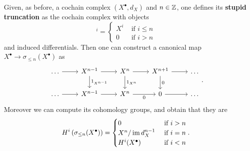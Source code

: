 \begin{defn}
	Given, as before, a cochain complex $\left( X^{\bullet}, d_{X} \right)$ and $n \in \mathbb{Z}$,
	one defines its	\textbf{stupid truncation} as the cochain complex with objects
	\begin{equation}
		[\sigma_{\leq n}(X^\bullet)]^i =
		\begin{cases}
			X^i & \text{ if } i \leq n\\
			0 & \text{ if } i > n
		\end{cases} 
	\end{equation} 
	and induced differentials.
	Then one can construct a canonical map $X^\bullet \to \sigma_{\leq n}(X^\bullet)$ as
	\begin{equation}
	\begin{tikzcd}
		\ldots \arrow[r, "", rightarrow] &
		X^{n-1} \arrow[r, "", rightarrow] \arrow[d, "1_{X^{n-1}}", rightarrow] &
		X^{n} \arrow[r, "", rightarrow] \arrow[d, "1_{X^{n}}", rightarrow] &
		X^{n+1} \arrow[r, "", rightarrow] \arrow[d, "0", rightarrow] &
		\ldots\\
		\ldots \arrow[r, "", rightarrow] &
		X^{n-1} \arrow[r, "", rightarrow] &
		X^{n} \arrow[r, "0"', rightarrow] &
		0 \arrow[r, "", rightarrow] &
		\ldots
	\end{tikzcd}
	.\end{equation} 
	Moreover we can compute its cohomology groups, and obtain that they are
	\begin{equation}
		H^i \left( \sigma_{\leq n}(X^\bullet) \right) =
		\begin{cases}
			0 & \text{ if } i > n\\
			X^n/\operatorname{im} d_X^{n-1} & \text{ if } i = n\\
			H^i(X^\bullet) & \text{ if } i < n
		\end{cases} 
	.\end{equation} 
\end{defn}

